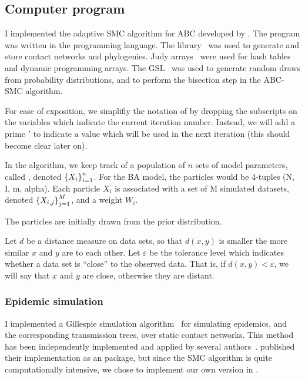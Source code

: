 \subsection{Computer program}

I implemented the adaptive \gls{SMC} algorithm for \gls{ABC} developed by
\textcite{del2012adaptive}. The program was written in the
 programming language. The 
library~\autocite{csardi2006igraph} was used to generate and store contact
networks and phylogenies. Judy arrays~\autocite{baskins2004judy} were used for
hash tables and dynamic programming arrays. The
\gls{GSL}~\autocite{gough2009gnu} was used to generate random draws from
probability distributions, and to perform the bisection step in the
\gls{ABC}-\gls{SMC} algorithm.

For ease of exposition, we simplifiy the notation of \textcite{del2012adaptive}
by dropping the subscripts on the variables which indicate the current
iteration number. Instead, we will add a prime $'$ to indicate a value which
will be used in the next iteration (this should become clear later on). 

In the algorithm, we keep track of a population of $n$ sets of model
parameters, called , denoted $\left\lbrace X_i\right\rbrace_{i=1}^{n}$. For the
\gls{BA} model, the particles would be 4-tuples (\gls{N}, \gls{I}, \gls{m},
\gls{alpha}). Each particle $X_i$ is associated with a set of \gls{M} simulated
datasets, denoted $\left\lbrace X_{i,j}\right\rbrace_{j=1}^M$, and a weight $W_i$. 

The particles are initially drawn from the prior distribution.

Let $d$ be a
distance measure on data sets, so that $d(x, y)$ is smaller the more similar
$x$ and $y$ are to each other. Let $\varepsilon$ be the tolerance level which
indicates whether a data set is ``close'' to the observed data. That is, if
$d(x, y) < \varepsilon$, we will say that $x$ and $y$ are close, otherwise they
are distant.

\subsubsection*{Epidemic simulation}
\label{subsubsec:nettree}

I implemented a Gillespie simulation algorithm~\autocite{gillespie1976general}
for simulating epidemics, and the corresponding transmission trees, over static
contact networks. This method has been independently implemented and applied by
several authors~\autocite[\textit{e.g.}][]{o2010contact, robinson2013dynamics,
leventhal2012inferring, groendyke2011bayesian}.
\textcite{groendyke2011bayesian} published their implementation as an
 package, but since the \gls{SMC} algorithm is quite
computationally intensive, we chose to implement our own version in
.

